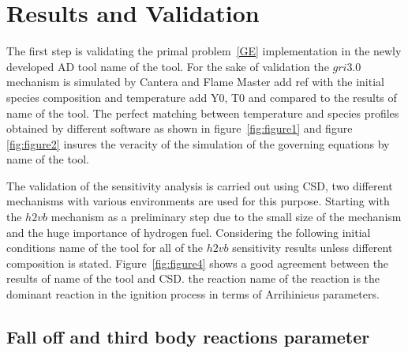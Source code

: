 \documentclass[preprint,review,12pt]{elsarticle}
\begin{document}
\section{Results and Validation}
The first step is validating the primal problem~\ref{GE} implementation in the newly developed AD tool  {\color{red} name of the tool}. For the sake of validation the $gri3.0$ mechanism is simulated by Cantera and Flame Master {\color{red} add ref} with the initial species composition and temperature  {\color{red} add Y0, T0} and compared to the results of {\color{red} name of the tool}. The perfect matching between temperature and species profiles obtained by different software as shown in figure~\ref{fig:figure1} and figure \ref{fig:figure2} insures the veracity of the simulation of the governing equations by {\color{red} name of the tool}.

         
%
%
The validation of the sensitivity analysis is carried out using CSD, two different mechanisms with various environments are used for this purpose. Starting with the $h2vb$ mechanism as a preliminary step due to the small size of the mechanism and the huge importance of hydrogen fuel. Considering the following initial conditions {\color{red} name of the tool} for all of the $h2vb$ sensitivity results unless different composition is stated. Figure~\ref{fig:figure4} shows a good agreement between the results of {\color{red} name of the tool} and CSD. the reaction  {\color{red} name of the reaction} is the dominant reaction in the ignition process in terms of Arrihinieus parameters. 
 

\subsection{Fall off and third body reactions parameter}
\end{document}

